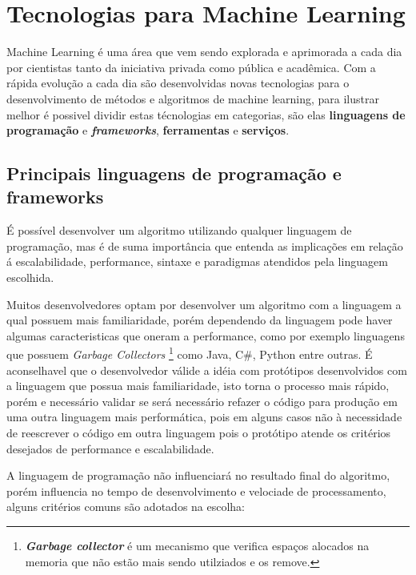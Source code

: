 \section{Tecnologias para Machine Learning}
\label{sec:tech-ml}

Machine Learning é uma área que vem sendo explorada e aprimorada a cada dia por cientistas tanto da iniciativa privada 
como pública e acadêmica. Com a rápida evolução a cada dia são desenvolvidas novas tecnologias para o desenvolvimento
de métodos e algoritmos de machine learning, para ilustrar melhor é possivel  dividir estas técnologias em categorias, são elas
\textbf{linguagens de programação} e \textbf{\textit{frameworks}}, \textbf{ferramentas} e \textbf{serviços}. 

\subsection{Principais linguagens de programação e frameworks}
\label{subsec:ling-prog}

É possível desenvolver um algoritmo utilizando qualquer linguagem de programação, mas é de suma importância que entenda as implicações
em relação á escalabilidade, performance, sintaxe e paradigmas atendidos pela linguagem escolhida. 

Muitos desenvolvedores optam por desenvolver um algoritmo com a linguagem a qual possuem mais familiaridade, 
porém dependendo da linguagem pode haver algumas caracteristicas que  oneram a performance, como por exemplo linguagens que possuem 
\textit{Garbage Collectors} \footnote{\textbf{\textit{Garbage collector}} é um mecanismo que verifica espaços alocados na memoria que não estão mais sendo utilziados e os remove.} como Java, C\#, Python entre outras. É aconselhavel que o desenvolvedor válide a 
idéia com protótipos desenvolvidos com a linguagem que possua mais familiaridade, isto torna o processo mais rápido, porém e necessário
validar se será necessário refazer o código para produção em uma outra linguagem mais performática, pois em alguns casos não à necessidade
de reescrever o código em outra linguagem pois o protótipo atende os critérios desejados de performance e escalabilidade. 

A linguagem de programação não influenciará no resultado final do algoritmo, porém influencia no tempo de desenvolvimento e 
velociade de processamento, alguns critérios comuns são adotados na escolha:

